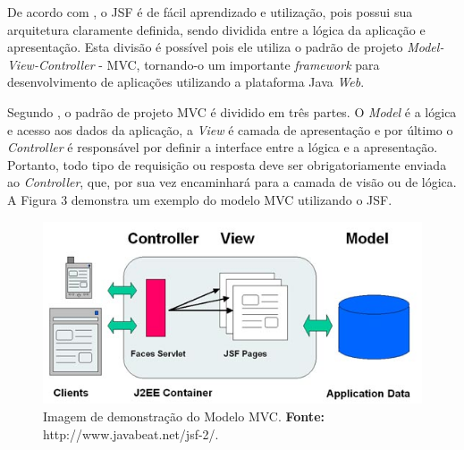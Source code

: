 \par De acordo com , o
JSF é de fácil aprendizado e utilização, pois possui sua arquitetura claramente definida, sendo dividida entre a lógica da aplicação e apresentação. Esta divisão é possível pois ele utiliza o padrão de projeto \textit{Model-View-Controller} - MVC\footnotemark[3], tornando-o um importante \textit{framework} para desenvolvimento de aplicações utilizando a plataforma Java \textit{Web}.


\par Segundo
, 
o padrão de projeto MVC é dividido em três partes. O \textit{Model} é a lógica e
acesso aos dados da aplicação, a \textit{View} é camada de apresentação e por
último o \textit{Controller} é responsável por definir a interface entre a lógica e a apresentação. Portanto, todo tipo de requisição ou resposta deve ser obrigatoriamente enviada 
ao \textit{Controller}, que, por sua vez encaminhará para a camada de visão ou de lógica. A Figura 3 demonstra um 
exemplo do modelo MVC utilizando o JSF.

\begin{figure}[h!]
	\centerline{\includegraphics[scale=0.5]{./imagens/jsf_using_mvc.jpg}}
	\caption[Imagem de demonstração do Modelo MVC]
	{Imagem de demonstração do Modelo MVC. \textbf{Fonte:}
	http://www.javabeat.net/jsf-2/.}
	\label{fig:exemplo3}
\end{figure}


